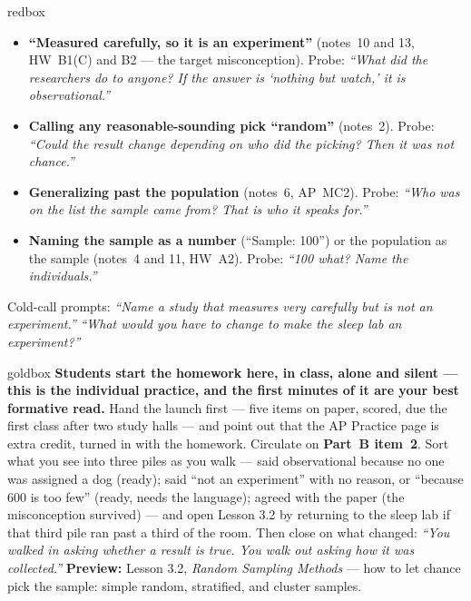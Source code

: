 \documentclass[10pt]{article}
\begin{document}
\boxguard
\begin{skillbox}{redbox}
\begin{itemize}[leftmargin=1.2em, nosep]
  \item \textbf{``Measured carefully, so it is an experiment''} (notes~10 and 13, HW~B1(C) and
        B2 --- the target misconception). Probe: \emph{``What did the researchers \emph{do} to
        anyone? If the answer is `nothing but watch,' it is observational.''}
  \item \textbf{Calling any reasonable-sounding pick ``random''} (notes~2). Probe: \emph{``Could
        the result change depending on who did the picking? Then it was not chance.''}
  \item \textbf{Generalizing past the population} (notes~6, AP~MC2). Probe: \emph{``Who was on
        the list the sample came from? That is who it speaks for.''}
  \item \textbf{Naming the sample as a number} (``Sample: 100'') or the population as the
        sample (notes~4 and 11, HW~A2). Probe: \emph{``100 \emph{what}? Name the
        individuals.''}
\end{itemize}
Cold-call prompts: \emph{``Name a study that measures very carefully but is not an
experiment.''} \quad \emph{``What would you have to change to make the sleep lab an
experiment?''}
\end{skillbox}

\boxguard
\begin{skillbox}{goldbox}
\textbf{Students start the homework here, in class, alone and silent --- this is the individual
practice, and the first minutes of it are your best formative read.} Hand the launch first ---
five items on paper, scored, due the first class after two study halls --- and point out that
the AP Practice page is extra credit, turned in with the homework. Circulate on \textbf{Part~B
item~2}. Sort what you see into three piles as you walk --- said observational because no one
was assigned a dog (ready); said ``not an experiment'' with no reason, or ``because 600 is too
few'' (ready, needs the language); agreed with the paper (the misconception survived) --- and
open Lesson 3.2 by returning to the sleep lab if that third pile ran past a third of the room.
Then close on what changed: \emph{``You walked in asking whether a result is true. You walk out
asking how it was collected.''} \textbf{Preview:} Lesson 3.2, \emph{Random Sampling Methods}
--- how to let chance pick the sample: simple random, stratified, and cluster samples.
\end{skillbox}
\end{document}
